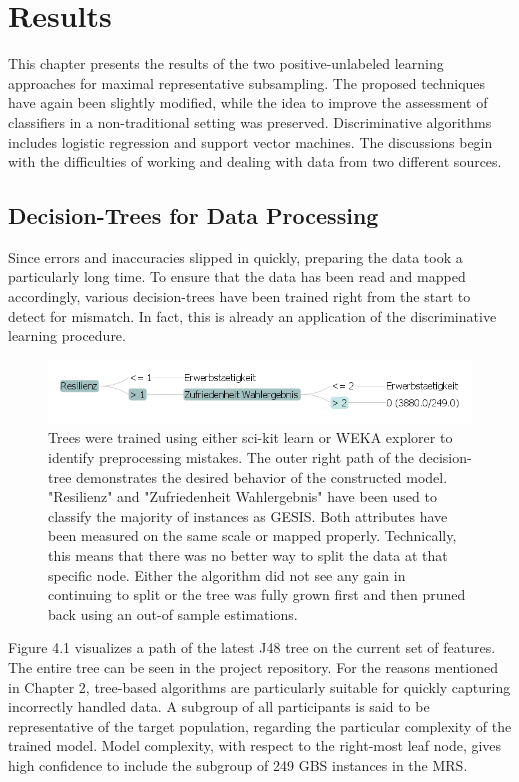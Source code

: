 \chapter{Results}\label{Sec:Results}

This chapter presents the results of the two positive-unlabeled learning approaches for maximal representative subsampling. The proposed techniques have again been slightly modified, while the idea to improve the assessment of classifiers in a non-traditional setting was preserved. Discriminative algorithms includes logistic regression and support vector machines. The discussions begin with the difficulties of working and dealing with data from two different sources.

\section{Decision-Trees for Data Processing}

Since errors and inaccuracies slipped in quickly, preparing the data took a particularly long time. To ensure that the data has been read and mapped accordingly, various decision-trees have been trained right from the start to detect for mismatch. In fact, this is already an application of the discriminative learning procedure.

\begin{figure}[ht]
\centering
\vspace{0.25cm}
   \includegraphics[scale=0.65,angle=0]{fig/treepath}
\captionsetup{width= 380pt}
\caption{Trees were trained using either sci-kit learn or WEKA explorer to identify preprocessing mistakes. The outer right path of the decision-tree demonstrates the desired behavior of the constructed model. "Resilienz"  and "Zufriedenheit Wahlergebnis" have been used to classify the majority of instances as GESIS. Both attributes have been measured on the same scale or mapped properly. Technically, this means that there was no better way to split the data at that specific node. Either the algorithm did not see any gain in continuing to split or the tree was fully grown first and then pruned back using an out-of sample estimations.}
\end{figure}

Figure 4.1 visualizes a path of the latest J48 tree on the current set of features. The entire tree can be seen in the project repository. For the reasons mentioned in Chapter 2, tree-based algorithms are particularly suitable for quickly capturing incorrectly handled data. A subgroup of all participants is said to be representative of the target population, regarding the particular complexity of the trained model. Model complexity, with respect to the right-most leaf node, gives high confidence to include the subgroup of 249 GBS instances in the MRS. 

